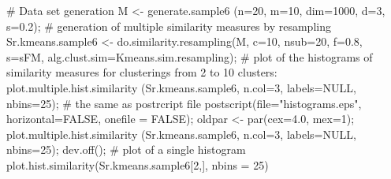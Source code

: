 \documentclass{article}
\begin{document}
\begin{Examples}
\begin{ExampleCode}
# Data set generation
M <- generate.sample6 (n=20, m=10, dim=1000, d=3, s=0.2);
# generation of multiple similarity measures by resampling
Sr.kmeans.sample6 <- do.similarity.resampling(M, c=10, nsub=20, f=0.8, s=sFM, 
                                      alg.clust.sim=Kmeans.sim.resampling); 
# plot of the histograms of similarity measures for clusterings from 2 to 10 clusters:
plot.multiple.hist.similarity (Sr.kmeans.sample6, n.col=3, labels=NULL, nbins=25);
# the same as postrcript file
postscript(file="histograms.eps", horizontal=FALSE, onefile = FALSE);
oldpar <- par(cex=4.0, mex=1);
plot.multiple.hist.similarity (Sr.kmeans.sample6, n.col=3, labels=NULL, nbins=25);
dev.off();
# plot of a single histogram
plot.hist.similarity(Sr.kmeans.sample6[2,], nbins = 25)
\end{ExampleCode}
\end{Examples}
\end{document}

